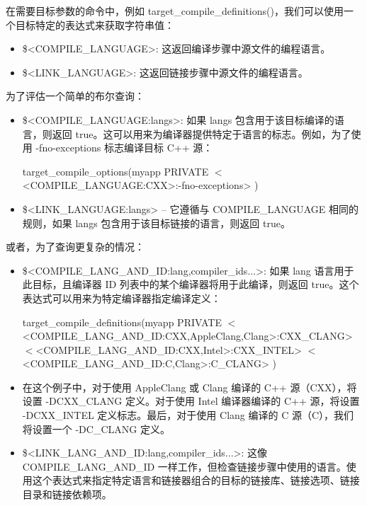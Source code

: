 在需要目标参数的命令中，例如 target\_compile\_definitions()，我们可以使用一个目标特定的表达式来获取字符串值：

\begin{itemize}
\item
\$<COMPILE\_LANGUAGE>: 这返回编译步骤中源文件的编程语言。

\item
\$<LINK\_LANGUAGE>: 这返回链接步骤中源文件的编程语言。
\end{itemize}

为了评估一个简单的布尔查询：

\begin{itemize}
\item
\$<COMPILE\_LANGUAGE:langs>: 如果 langs 包含用于该目标编译的语言，则返回 true。这可以用来为编译器提供特定于语言的标志。例如，为了使用 -fno-exceptions 标志编译目标 C++ 源：

\begin{cmake}
target_compile_options(myapp
    PRIVATE $<$<COMPILE_LANGUAGE:CXX>:-fno-exceptions>
)
\end{cmake}

\item
\$<LINK\_LANGUAGE:langs> – 它遵循与 COMPILE\_LANGUAGE 相同的规则，如果 langs 包含用于该目标链接的语言，则返回 true。
\end{itemize}

或者，为了查询更复杂的情况：

\begin{itemize}
\item
\$<COMPILE\_LANG\_AND\_ID:lang,compiler\_ids...>: 如果 lang 语言用于此目标，且编译器 ID 列表中的某个编译器将用于此编译，则返回 true。这个表达式可以用来为特定编译器指定编译定义：

\begin{cmake}
target_compile_definitions(myapp PRIVATE
    $<$<COMPILE_LANG_AND_ID:CXX,AppleClang,Clang>:CXX_CLANG>
    $<$<COMPILE_LANG_AND_ID:CXX,Intel>:CXX_INTEL>
    $<$<COMPILE_LANG_AND_ID:C,Clang>:C_CLANG>
)
\end{cmake}

\item
在这个例子中，对于使用 AppleClang 或 Clang 编译的 C++ 源（CXX），将设置 -DCXX\_CLANG 定义。对于使用 Intel 编译器编译的 C++ 源，将设置 -DCXX\_INTEL 定义标志。最后，对于使用 Clang 编译的 C 源（C），我们将设置一个 -DC\_CLANG 定义。

\item
\$<LINK\_LANG\_AND\_ID:lang,compiler\_ids...>: 这像 COMPILE\_LANG\_AND\_ID 一样工作，但检查链接步骤中使用的语言。使用这个表达式来指定特定语言和链接器组合的目标的链接库、链接选项、链接目录和链接依赖项。
\end{itemize}

